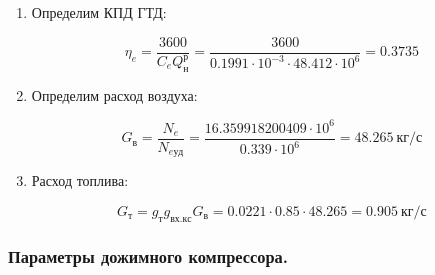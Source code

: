 \documentclass[a4paper,12pt]{article}
\begin{document}
\begin{enumerate}
	\item Определим КПД ГТД:
	
	\[
	\eta_e = \frac{ 3600 }{ C_e Q_н^р } = 
			\frac{ 3600 }{ 0.1991 \cdot 10^{-3} \cdot 48.412 \cdot 10^6} 
	= 0.3735
	\]
	
	\item Определим расход воздуха:
	
	\[
	G_в = \frac{N_e}{N_{e уд} } = 
	\frac{ 16.359918200409 \cdot 10^6 }{ 0.339 \cdot 10^6 } = 
	48.265\ кг/с
	\]

	\item Расход топлива:

	\[
		G_{т} = g_т g_{вх.кс} G_в = 0.0221 \cdot 0.85
		\cdot 48.265 =
		0.905\ кг/с
	\]

\end{enumerate}




    \subsubsection{Параметры дожимного компрессора.}
\end{document}
